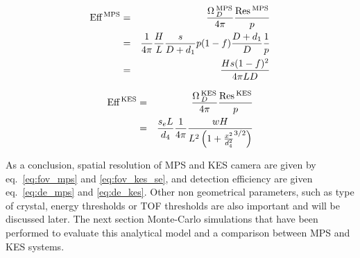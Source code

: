 \documentclass[a4paper,english]{article}
\begin{document}
\begin{eqnarray}
  \label{eq:de_mps}
  \textrm{Eff}\,_{}^{\textrm{MPS}} & = & \frac{\Omega\,_D^{\textrm{MPS}}}{4\pi} \frac{\textrm{Res}\,_{}^{\textrm{MPS}}}{p} \nonumber\\
                & = & \frac{1}{4\pi} \frac{H}{L} \frac{s}{D+d_1} p(1-f)
                      \frac{D+d_1}{D} \frac{1}{p} \nonumber\\
                & = & \frac{Hs(1-f)^2}{4 \pi L D}
\end{eqnarray}


\begin{eqnarray}
  \label{eq:de_kes}
  \textrm{Eff}\,_{}^{\textrm{KES}} & = & \frac{\Omega\,_D^{\textrm{KES}}}{4\pi} \frac{\textrm{Res}\,_{}^{\textrm{KES}}}{p} \nonumber\\
                & = & \frac{s_eL}{d_4} \frac{1}{4\pi} \frac{wH}{L^2 \left( 1+\frac{x^2}{d_4^2}^{3/2} \right)}
\end{eqnarray}


As a conclusion, spatial resolution of MPS and KES camera are given by
eq.~\ref{eq:fov_mps} and \ref{eq:fov_kes_se}, and detection efficiency are given
eq.~\ref{eq:de_mps} and \ref{eq:de_kes}. Other non geometrical parameters, such
as type of crystal, energy thresholds or TOF thresholds are also important and
will be discussed later. The next section Monte-Carlo simulations that have been
performed to evaluate this analytical model and a comparison between MPS and KES
systems.





\end{document}
